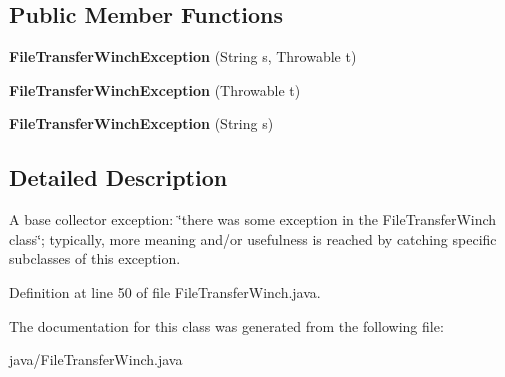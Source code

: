 \subsection*{Public Member Functions}
\begin{DoxyCompactItemize}
\item 
{\bfseries File\-Transfer\-Winch\-Exception} (String s, Throwable t)\label{classorg_1_1smallfoot_1_1filexfer_1_1FileTransferWinch_1_1FileTransferWinchException_abf4a7354f578a7ff2783d7259d4a35c1}

\item 
{\bfseries File\-Transfer\-Winch\-Exception} (Throwable t)\label{classorg_1_1smallfoot_1_1filexfer_1_1FileTransferWinch_1_1FileTransferWinchException_a24d32d742afc2eb515a707f9086ae9a6}

\item 
{\bfseries File\-Transfer\-Winch\-Exception} (String s)\label{classorg_1_1smallfoot_1_1filexfer_1_1FileTransferWinch_1_1FileTransferWinchException_a28313c0c520cd234b6ccc2fafa72f8e5}

\end{DoxyCompactItemize}


\subsection{Detailed Description}
A base collector exception\-: \char`\"{}there was some exception in the File\-Transfer\-Winch class\char`\"{}; typically, more meaning and/or usefulness is reached by catching specific subclasses of this exception. 

Definition at line 50 of file File\-Transfer\-Winch.\-java.



The documentation for this class was generated from the following file\-:\begin{DoxyCompactItemize}
\item 
java/File\-Transfer\-Winch.\-java\end{DoxyCompactItemize}

